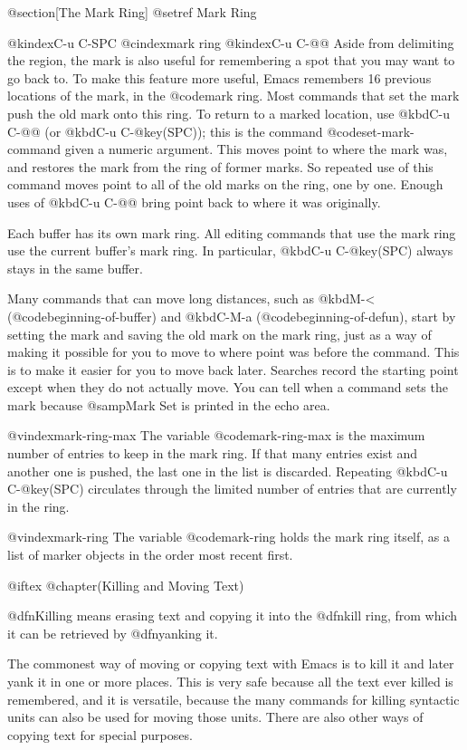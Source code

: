 {{{{{@section[The Mark Ring]
@setref Mark Ring

@kindex{C-u C-SPC}
@cindex{mark ring}
@kindex{C-u C-@@}
  Aside from delimiting the region, the mark is also useful for remembering
a spot that you may want to go back to.  To make this feature more useful,
Emacs remembers 16 previous locations of the mark, in the @code{mark
ring}.  Most commands that set the mark push the old mark onto this ring.
To return to a marked location, use @kbd{C-u C-@@} (or @kbd{C-u C-@key(SPC)});
this is the command @code{set-mark-command} given a numeric argument.
This moves point to where the mark was, and restores the mark from the ring
of former marks.  So repeated use of this command moves point to all of the
old marks on the ring, one by one.  Enough uses of @kbd{C-u C-@@} bring
point back to where it was originally.

  Each buffer has its own mark ring.  All editing commands that use
the mark ring use the current buffer's mark ring.  In particular,
@kbd{C-u C-@key(SPC)} always stays in the same buffer.

  Many commands that can move long distances, such as @kbd{M-<}
(@code{beginning-of-buffer}) and @kbd{C-M-a} (@code{beginning-of-defun}),
start by setting the mark and saving the old mark on the mark ring, just as
a way of making it possible for you to move to where point was before the
command.  This is to make it easier for you to move back later.  Searches
record the starting point except when they do not actually move.  You can
tell when a command sets the mark because @samp{Mark Set} is printed in the
echo area.

@vindex{mark-ring-max}
  The variable @code{mark-ring-max} is the maximum number of entries to
keep in the mark ring.  If that many entries exist and another one is
pushed, the last one in the list is discarded.  Repeating
@kbd{C-u C-@key(SPC)} circulates through the limited number of
entries that are currently in the ring.

@vindex{mark-ring}
  The variable @code{mark-ring} holds the mark ring itself, as a list of
marker objects in the order most recent first.

@iftex
@chapter(Killing and Moving Text)

  @dfn{Killing} means erasing text and copying it into the @dfn{kill
ring}, from which it can be retrieved by @dfn{yanking} it.

  The commonest way of moving or copying text with Emacs is to kill it and
later yank it in one or more places.  This is very safe because all the
text ever killed is remembered, and it is versatile, because the many
commands for killing syntactic units can also be used for moving those
units.  There are also other ways of copying text for special purposes.

}}}}}

